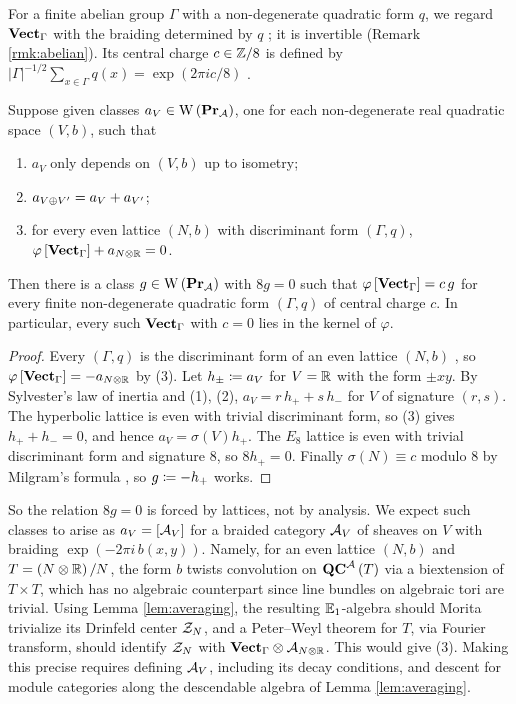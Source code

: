 For a finite abelian group $\Gamma$ with a non-degenerate quadratic form $q$, we regard
$\mathbf{Vect}_\Gamma$ with the braiding determined by $q$ \cite{JS:braided}; it is invertible \cite{BJSS}
(Remark \ref{rmk:abelian}). Its central charge $c\in\mathbb{Z}/8$ is defined by
$\left|\Gamma\right|^{-1/2}\sum_{x\in\Gamma}q\left(x\right)=\exp\left(2\pi ic/8\right)$
\cite[Appendix 4]{MH}.

\begin{prop}
\label{prop:Witt_reduction}
Suppose given classes $a_V\in\mathrm{W}\left(\mathbf{Pr}_{\mathbf{\mathcal{A}}}\right)$, one for each non-degenerate real
quadratic space $\left(V,b\right)$, such that
\begin{enumerate}
\item $a_V$ only depends on $\left(V,b\right)$ up to isometry;
\item $a_{V\oplus V'}=a_V+a_{V'}$;
\item for every even lattice $\left(N,b\right)$ with discriminant form $\left(\Gamma,q\right)$,
$\varphi\left[\mathbf{Vect}_\Gamma\right]+a_{N\otimes\mathbb{R}}=0$.
\end{enumerate}
Then there is a class $g\in\mathrm{W}\left(\mathbf{Pr}_{\mathbf{\mathcal{A}}}\right)$ with $8g=0$ such that
$\varphi\left[\mathbf{Vect}_\Gamma\right]=c\,g$ for every finite non-degenerate quadratic form
$\left(\Gamma,q\right)$ of central charge $c$. In particular, every such $\mathbf{Vect}_\Gamma$ with $c=0$
lies in the kernel of $\varphi$.
\end{prop}

\begin{proof}
Every $\left(\Gamma,q\right)$ is the discriminant form of an even lattice $\left(N,b\right)$
\cite[Theorem 1.10.1]{Nik}, so $\varphi\left[\mathbf{Vect}_\Gamma\right]=-a_{N\otimes\mathbb{R}}$ by (3). Let
$h_\pm\coloneqq a_V$ for $V=\mathbb{R}$ with the form $\pm xy$. By Sylvester's law of inertia and (1), (2),
$a_V=r\,h_++s\,h_-$ for $V$ of signature $\left(r,s\right)$. The hyperbolic lattice is even with
trivial discriminant form, so (3) gives $h_++h_-=0$, and hence $a_V=\sigma\left(V\right)h_+$. The
$E_8$ lattice is even with trivial discriminant form and signature $8$, so $8h_+=0$. Finally
$\sigma\left(N\right)\equiv c$ modulo $8$ by Milgram's formula \cite[Appendix 4]{MH}, so
$g\coloneqq-h_+$ works.
\end{proof}

So the relation $8g=0$ is forced by lattices, not by analysis. We expect such classes to arise as
$a_V=\left[\mathcal{A}_V\right]$ for a braided category $\mathcal{A}_V$ of sheaves on $V$ with braiding
$\exp\left(-2\pi i\,b\left(x,y\right)\right)$. Namely, for an even lattice $\left(N,b\right)$ and
$T=\left(N\otimes\mathbb{R}\right)/N$, the form $b$ twists convolution on $\mathbf{QC}^{\mathbf{\mathcal{A}}}\left(T\right)$ via a
biextension of $T\times T$, which has no algebraic counterpart since line bundles on algebraic tori
are trivial. Using Lemma \ref{lem:averaging}, the resulting $\mathbb{E}_1$-algebra should Morita trivialize
its Drinfeld center $\mathcal{Z}_N$, and a Peter--Weyl theorem for $T$, via Fourier transform, should
identify $\mathcal{Z}_N$ with $\mathbf{Vect}_\Gamma\otimes\mathcal{A}_{N\otimes\mathbb{R}}$. This would give (3). Making this
precise requires defining $\mathcal{A}_V$, including its decay conditions, and descent for module
categories along the descendable algebra of Lemma \ref{lem:averaging}.

